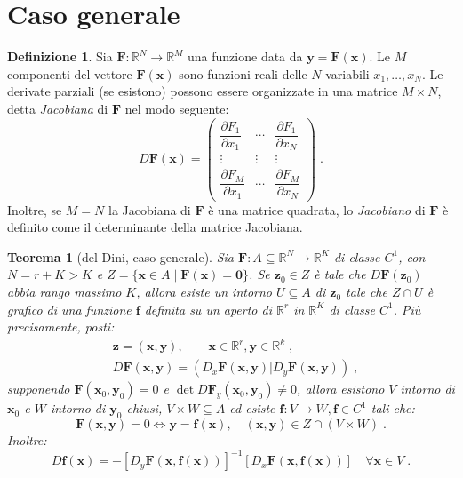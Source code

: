\documentclass[a4paper,12pt]{report}
\theoremstyle{plain}
\newtheorem{thm}{Teorema}[section]
\theoremstyle{definition}
\newtheorem{defn}{Definizione}[section]
\theoremstyle{remark}
\numberwithin{equation}{section}
\begin{document}
\section{Caso generale}
\begin{defn} Sia $\mathbf{F}:\mathbb{R}^N \to \mathbb{R}^M$ una funzione data da $\mathbf{y}=\mathbf{F}(\mathbf{x})$. Le $M$ componenti del vettore $\mathbf{F}(\mathbf{x})$ sono funzioni reali delle $N$ variabili $x_1,\ldots,x_N$. Le derivate parziali (se esistono) possono essere organizzate in una matrice $M \times N$, detta \textit{Jacobiana} di $\mathbf{F}$ nel modo seguente:
\begin{equation}
D\mathbf{F}(\mathbf{x})=\begin{pmatrix}
                         \dfrac{\partial F_1}{\partial x_1} & \cdots & \dfrac{\partial F_1}{\partial x_N} \\
\vdots & \vdots & \vdots \\
\dfrac{\partial F_M}{\partial x_1} & \cdots & \dfrac{\partial F_M}{\partial x_N}
                        \end{pmatrix}\;.
\end{equation}
Inoltre, se $M=N$ la Jacobiana di $\mathbf{F}$ è una matrice quadrata, lo \textit{Jacobiano} di $\mathbf{F}$ è definito come il 
determinante della matrice Jacobiana.
\end{defn}
\begin{thm}[del Dini, caso generale] Sia $\mathbf{F}:A \subseteq \mathbb{R}^N \to \mathbb{R}^K$ di classe $C^1$, con $N=r+K>K$ e $Z=\{ \mathbf{x}\in A\;|\; \mathbf{F}(\mathbf{x})=\mathbf{0}\}$. Se $\mathbf{z}_0 \in Z$ è tale che $D\mathbf{F}(\mathbf{z}_0)$ abbia rango massimo $K$, allora esiste un intorno $U\subseteq A$ di $\mathbf{z}_0$ tale che $Z \cap U$ è grafico di una funzione $\mathbf{f}$ definita su un aperto di $\mathbb{R}^r$ in $\mathbb{R}^K$ di classe $C^1$. Più precisamente, posti:
\begin{align}
&\mathbf{z}=(\mathbf{x},\mathbf{y}),\qquad \mathbf{x}\in\mathbb{R}^r,\mathbf{y}\in\mathbb{R}^k\;, \\
& D\mathbf{F}(\mathbf{x},\mathbf{y})=(D_x\mathbf{F}(\mathbf{x},\mathbf{y})|D_y\mathbf{F}(\mathbf{x},\mathbf{y}))\;,
\end{align}
supponendo $\mathbf{F}(\mathbf{x}_0,\mathbf{y}_0)=0$ e $\det D\mathbf{F}_y(\mathbf{x}_0,\mathbf{y}_0)\ne 0$, allora esistono $V$ intorno 
di $\mathbf{x}_0$ e $W$ intorno di $\mathbf{y}_0$ chiusi, $V\times W \subseteq A$ ed esiste $\mathbf{f}:V \to W, \mathbf{f} \in C^1$ tali
 che:
\begin{equation}
\mathbf{F}(\mathbf{x},\mathbf{y})=0 \Longleftrightarrow \mathbf{y}=\mathbf{f}(\mathbf{x}), \quad (\mathbf{x},\mathbf{y})\in Z \cap 
(V \times W)\;.
\end{equation}
Inoltre:
\begin{equation}
D\mathbf{f}(\mathbf{x})=-[D_y\mathbf{F}(\mathbf{x},\mathbf{f}(\mathbf{x}))]^{-1}[D_x\mathbf{F}(\mathbf{x},\mathbf{f}(\mathbf{x}))] \quad \forall \mathbf{x} \in V\;.
\end{equation}
\end{thm}
\end{document}
